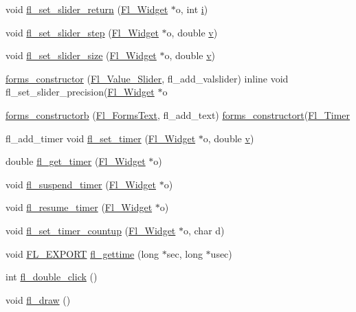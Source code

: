 \begin{DoxyCompactItemize}
\item 
void \hyperlink{forms_8_h_ada8d990d85b8c5d942bbfeaf5823bc9b}{fl\+\_\+set\+\_\+slider\+\_\+return} (\hyperlink{class_fl___widget}{Fl\+\_\+\+Widget} $\ast$o, int \hyperlink{forms_8_h_acb559820d9ca11295b4500f179ef6392}{i})
\item 
void \hyperlink{forms_8_h_ae1693b926b2126c44c57c5b0d8113fcd}{fl\+\_\+set\+\_\+slider\+\_\+step} (\hyperlink{class_fl___widget}{Fl\+\_\+\+Widget} $\ast$o, double \hyperlink{forms_8_h_a3b90d5a73541ab9402511d87bed076ef}{v})
\item 
void \hyperlink{forms_8_h_ab017173b9a753abd84358d19f17cd352}{fl\+\_\+set\+\_\+slider\+\_\+size} (\hyperlink{class_fl___widget}{Fl\+\_\+\+Widget} $\ast$o, double \hyperlink{forms_8_h_a3b90d5a73541ab9402511d87bed076ef}{v})
\item 
\hyperlink{forms_8_h_a78f97791090442a83b962429f17e8b07}{forms\+\_\+constructor} (\hyperlink{class_fl___value___slider}{Fl\+\_\+\+Value\+\_\+\+Slider}, fl\+\_\+add\+\_\+valslider) inline void fl\+\_\+set\+\_\+slider\+\_\+precision(\hyperlink{class_fl___widget}{Fl\+\_\+\+Widget} $\ast$o
\item 
\hyperlink{forms_8_h_a40723bee8eca1aed53b00312fa48d7b9}{forms\+\_\+constructorb} (\hyperlink{class_fl___forms_text}{Fl\+\_\+\+Forms\+Text}, fl\+\_\+add\+\_\+text) \hyperlink{forms_8_h_a8eac24d863b57042573cb40c5f527857}{forms\+\_\+constructort}(\hyperlink{class_fl___timer}{Fl\+\_\+\+Timer}
\item 
fl\+\_\+add\+\_\+timer void \hyperlink{forms_8_h_a89ccf97d6aac99812f25bb13a0bed7c8}{fl\+\_\+set\+\_\+timer} (\hyperlink{class_fl___widget}{Fl\+\_\+\+Widget} $\ast$o, double \hyperlink{forms_8_h_a3b90d5a73541ab9402511d87bed076ef}{v})
\item 
double \hyperlink{forms_8_h_a16f9fe343ab99c312c2f0ae82a701b11}{fl\+\_\+get\+\_\+timer} (\hyperlink{class_fl___widget}{Fl\+\_\+\+Widget} $\ast$o)
\item 
void \hyperlink{forms_8_h_a00555ab16662f07f144028c38270e7cc}{fl\+\_\+suspend\+\_\+timer} (\hyperlink{class_fl___widget}{Fl\+\_\+\+Widget} $\ast$o)
\item 
void \hyperlink{forms_8_h_a264cc89c2ace64ab618bdf0093e9e7a6}{fl\+\_\+resume\+\_\+timer} (\hyperlink{class_fl___widget}{Fl\+\_\+\+Widget} $\ast$o)
\item 
void \hyperlink{forms_8_h_a1bc04df8da885e579140586b66811e6f}{fl\+\_\+set\+\_\+timer\+\_\+countup} (\hyperlink{class_fl___widget}{Fl\+\_\+\+Widget} $\ast$o, char d)
\item 
void \hyperlink{_fl___export_8_h_aa9ba29a18aee9d738370a06eeb4470fc}{F\+L\+\_\+\+E\+X\+P\+O\+RT} \hyperlink{forms_8_h_ab6f3c334331274c5a76cc69b06cc8781}{fl\+\_\+gettime} (long $\ast$sec, long $\ast$usec)
\item 
int \hyperlink{forms_8_h_ad4fc3358a27d87ba9f62709a8af31e6c}{fl\+\_\+double\+\_\+click} ()
\item 
void \hyperlink{forms_8_h_a47b221f9bdc850888b0d2f99f6ca7f8c}{fl\+\_\+draw} ()
\end{DoxyCompactItemize}
